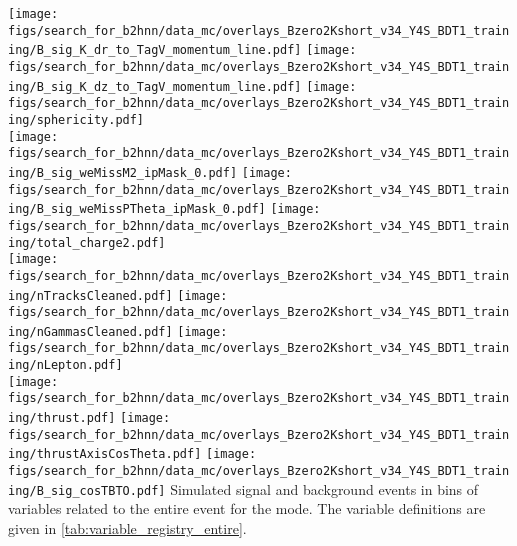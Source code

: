 {
\texttt{[image: figs/search\_for\_b2hnn/data\_mc/overlays\_Bzero2Kshort\_v34\_Y4S\_BDT1\_training/B\_sig\_K\_dr\_to\_TagV\_momentum\_line.pdf]}
\texttt{[image: figs/search\_for\_b2hnn/data\_mc/overlays\_Bzero2Kshort\_v34\_Y4S\_BDT1\_training/B\_sig\_K\_dz\_to\_TagV\_momentum\_line.pdf]}
\texttt{[image: figs/search\_for\_b2hnn/data\_mc/overlays\_Bzero2Kshort\_v34\_Y4S\_BDT1\_training/sphericity.pdf]}\\
\texttt{[image: figs/search\_for\_b2hnn/data\_mc/overlays\_Bzero2Kshort\_v34\_Y4S\_BDT1\_training/B\_sig\_weMissM2\_ipMask\_0.pdf]}
\texttt{[image: figs/search\_for\_b2hnn/data\_mc/overlays\_Bzero2Kshort\_v34\_Y4S\_BDT1\_training/B\_sig\_weMissPTheta\_ipMask\_0.pdf]}
\texttt{[image: figs/search\_for\_b2hnn/data\_mc/overlays\_Bzero2Kshort\_v34\_Y4S\_BDT1\_training/total\_charge2.pdf]}\\
\texttt{[image: figs/search\_for\_b2hnn/data\_mc/overlays\_Bzero2Kshort\_v34\_Y4S\_BDT1\_training/nTracksCleaned.pdf]}
\texttt{[image: figs/search\_for\_b2hnn/data\_mc/overlays\_Bzero2Kshort\_v34\_Y4S\_BDT1\_training/nGammasCleaned.pdf]}
\texttt{[image: figs/search\_for\_b2hnn/data\_mc/overlays\_Bzero2Kshort\_v34\_Y4S\_BDT1\_training/nLepton.pdf]}\\
\texttt{[image: figs/search\_for\_b2hnn/data\_mc/overlays\_Bzero2Kshort\_v34\_Y4S\_BDT1\_training/thrust.pdf]}
\texttt{[image: figs/search\_for\_b2hnn/data\_mc/overlays\_Bzero2Kshort\_v34\_Y4S\_BDT1\_training/thrustAxisCosTheta.pdf]}
\texttt{[image: figs/search\_for\_b2hnn/data\_mc/overlays\_Bzero2Kshort\_v34\_Y4S\_BDT1\_training/B\_sig\_cosTBTO.pdf]}
}
{
Simulated signal and background events in bins of variables related to the entire event for the \BKznn mode.
\overlaytext
The variable definitions are given in \cref{tab:variable_registry_entire}.
}

